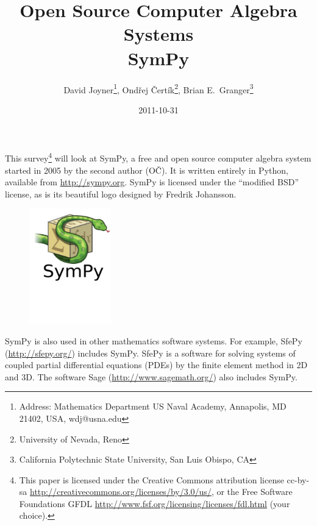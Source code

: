 \documentclass[12pt]{article}
\def\OC{OČ}
\begin{document}
\author{David Joyner\thanks{Address: Mathematics Department
US Naval Academy, Annapolis, MD 21402, USA, wdj@usna.edu},
Ondřej Čertík\thanks{University of Nevada, Reno},
Brian E.~Granger\thanks{California Polytechnic State University, San Luis Obispo, CA}}
\title{{\small{Open Source Computer Algebra Systems}}\\ {\LARGE{SymPy}}}

\date{2011-10-31}

\maketitle




This survey\footnote{This paper is licensed under the
Creative Commons attribution license cc-by-sa
\url{http://creativecommons.org/licenses/by/3.0/us/},
or the Free Software Foundations GFDL
\url{http://www.fsf.org/licensing/licenses/fdl.html}
(your choice).} 
will look at SymPy, a free and open source computer algebra
system started in 2005 by the second author (\OC).
It is written entirely in Python, available from 
\url{http://sympy.org}.
SymPy is licensed under the ``modified BSD'' license, as is its
beautiful logo designed by Fredrik Johansson.

\begin{figure}[h!]
\begin{center}
\includegraphics[height=5cm]{sympy-snake-icon.pdf}
\end{center}
\end{figure}

\vskip-2cm

SymPy is also used in other mathematics software systems.
For example, SfePy (\url{http://sfepy.org/})
includes SymPy. SfePy is a software for solving systems of coupled partial differential 
equations (PDEs) by the finite element method in 2D and 3D.
The software Sage (\url{http://www.sagemath.org/}) also includes SymPy.
\end{document}

